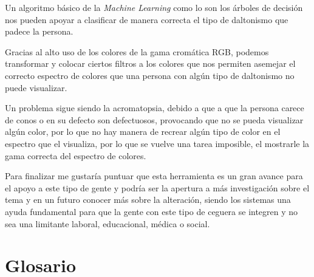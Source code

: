\documentclass[10pt]{article}
\begin{document}
Un algoritmo básico de la \textit{Machine Learning} como lo son los árboles de decisión nos pueden apoyar a clasificar de manera correcta el tipo de daltonismo que padece la persona.

Gracias al alto uso de los colores de la gama cromática RGB, podemos transformar y colocar ciertos filtros a los colores que nos permiten asemejar el correcto espectro de colores que una persona con algún tipo de daltonismo no puede visualizar.

Un problema sigue siendo la acromatopsia, debido a que a que la persona carece de conos o en su defecto son defectuosos, provocando que no se pueda visualizar algún color, por lo que no hay manera de recrear algún tipo de color en el espectro que el visualiza, por lo que se vuelve una tarea imposible, el mostrarle la gama correcta del espectro de colores.

Para finalizar me gustaría puntuar que esta herramienta es un gran avance para el apoyo a este tipo de gente y podría ser la apertura a más investigación sobre el tema y en un futuro conocer más sobre la alteración, siendo los sistemas una ayuda fundamental para que la gente con este tipo de ceguera se integren y no sea una limitante laboral, educacional, médica o social.
\newpage
\section{Glosario}
\end{document}
